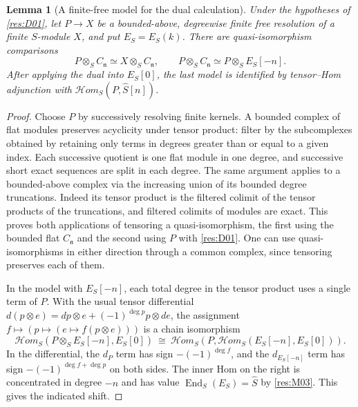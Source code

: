 \documentclass[11pt,oneside,openany]{book}
\newtheorem{lemma}[theorem]{Lemma}
\theoremstyle{definition}
\theoremstyle{remark}
\begin{document}
\begin{lemma}[A finite-free model for the dual calculation]\label{res:D02}
Under the hypotheses of \ref{res:D01}, let
$P\to X$ be a bounded-above, degreewise finite free resolution of
a finite $S$-module $X$, and put $E_S=E_S(k)$. There are
quasi-isomorphism comparisons
\[
 P\otimes_S C_{\mathfrak n}\simeq X\otimes_S C_{\mathfrak n},
 \qquad
 P\otimes_S C_{\mathfrak n}\simeq P\otimes_S E_S[-n].
\]
After applying the dual into $E_S[0]$, the last model is identified
by tensor--Hom adjunction with $\mathcal H om_S(P,\widehat S[n])$.
\end{lemma}
\begin{proof}
Choose $P$ by successively resolving finite kernels. A bounded
complex of flat modules preserves acyclicity under tensor product:
filter by the subcomplexes obtained by retaining only terms
in degrees greater than or equal to a given index. Each successive
quotient is one flat module in one degree, and successive short
exact sequences are split in each degree. The same argument applies
to a bounded-above complex via the increasing union of its bounded
degree truncations. Indeed its tensor product is the filtered
colimit of the tensor products of the truncations, and filtered
colimits of modules are exact. This proves both applications of
tensoring a quasi-isomorphism, the first using the bounded flat
$C_{\mathfrak n}$ and the second using $P$ with \ref{res:D01}.
One can use quasi-isomorphisms in either direction through a
common complex, since tensoring preserves each of them.

In the model with $E_S[-n]$, each total degree in the tensor
product uses a single term of $P$. With the usual tensor
differential $d(p\otimes e)=dp\otimes e+(-1)^{\deg p}p\otimes de$,
the assignment $f\mapsto (p\mapsto(e\mapsto f(p\otimes e)))$
is a chain isomorphism
\[
 \mathcal H om_S(P\otimes_S E_S[-n],E_S[0])
 \ \cong\
 \mathcal H om_S(P,\mathcal H om_S(E_S[-n],E_S[0])) .
\]
In the differential, the $d_P$ term has sign $-(-1)^{\deg f}$,
and the $d_{E_S[-n]}$ term has sign
$-(-1)^{\deg f+\deg p}$ on both sides. The inner Hom on the right
is concentrated in degree $-n$ and has value
$\operatorname{End}_S(E_S)=\widehat S$ by \ref{res:M03}. This
gives the indicated shift.
\end{proof}
\end{document}
